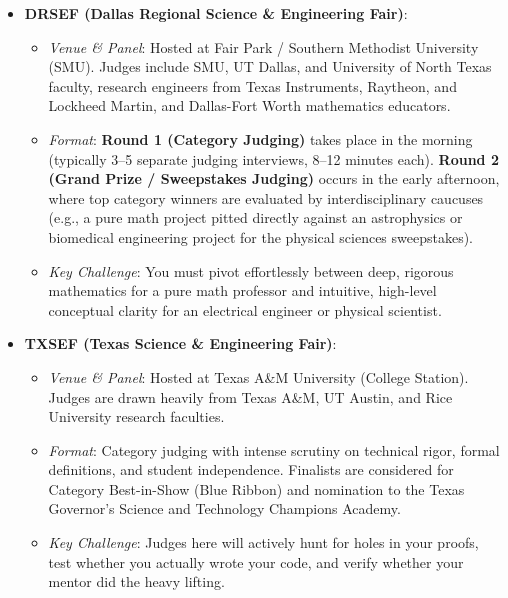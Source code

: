 \documentclass[11pt,letterpaper]{article}
\begin{document}
\begin{itemize}[leftmargin=*]
    \item \textbf{DRSEF (Dallas Regional Science \& Engineering Fair)}:
    \begin{itemize}
        \item \textit{Venue \& Panel}: Hosted at Fair Park / Southern Methodist University (SMU). Judges include SMU, UT Dallas, and University of North Texas faculty, research engineers from Texas Instruments, Raytheon, and Lockheed Martin, and Dallas-Fort Worth mathematics educators.
        \item \textit{Format}: \textbf{Round 1 (Category Judging)} takes place in the morning (typically 3--5 separate judging interviews, 8--12 minutes each). \textbf{Round 2 (Grand Prize / Sweepstakes Judging)} occurs in the early afternoon, where top category winners are evaluated by interdisciplinary caucuses (e.g., a pure math project pitted directly against an astrophysics or biomedical engineering project for the physical sciences sweepstakes).
        \item \textit{Key Challenge}: You must pivot effortlessly between deep, rigorous mathematics for a pure math professor and intuitive, high-level conceptual clarity for an electrical engineer or physical scientist.
    \end{itemize}

    \item \textbf{TXSEF (Texas Science \& Engineering Fair)}:
    \begin{itemize}
        \item \textit{Venue \& Panel}: Hosted at Texas A\&M University (College Station). Judges are drawn heavily from Texas A\&M, UT Austin, and Rice University research faculties.
        \item \textit{Format}: Category judging with intense scrutiny on technical rigor, formal definitions, and student independence. Finalists are considered for Category Best-in-Show (Blue Ribbon) and nomination to the Texas Governor's Science and Technology Champions Academy.
        \item \textit{Key Challenge}: Judges here will actively hunt for holes in your proofs, test whether you actually wrote your code, and verify whether your mentor did the heavy lifting.
    \end{itemize}


\end{itemize}
\end{document}

